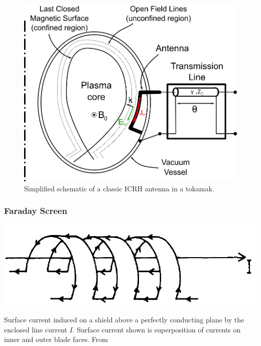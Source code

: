\begin{figure}[h]
	\centering
	\includegraphics[width=0.9\linewidth]{figures/chap3/ICRH_antenna_simplified}
	\caption{Simplified schematic of a classic ICRH antenna in a tokamak.}
	\label{fig:icrhantennasimplified}
\end{figure}



\subsubsection{Faraday Screen}
\begin{marginfigure}
	\centering
	\includegraphics[width=1.0\linewidth]{figures/chap3/WEST_ICRH/ICRH_Faraday_Screen_Principle}
	\caption{Surface current induced on a shield above a perfectly conducting plane by the enclosed line current $I$. Surface current shown is superposition of currents on inner and outer blade faces. From \cite{faulconer1983}}
	\label{fig:icrhfaradayscreenprinciple}
\end{marginfigure}

